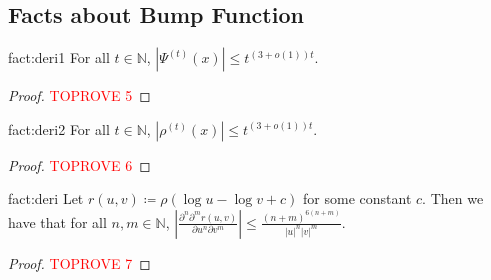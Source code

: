 \documentclass[12pt]{article}
\newcommand{\N}{\mathbb{N}}  \newcommand{\R}{\mathbb{R}} \newcommand{\C}{\mathbb{C}} \newcommand{\U}{\mathbb{U}} \renewcommand{\d}{\mathrm{d}} \DeclareMathOperator*{\E}{\mathbb{E}}  \newcommand{\so}{\mathrm{SO}} \newcommand{\s}{\mathrm{S}} \newcommand{\su}{\mathrm{SU}} \renewcommand{\i}{\mathrm{i}} \newcommand{\A}{\mathcal{A}}  \newcommand{\B}{\mathcal{B}} \newcommand{\CC}{\mathcal{C}} \newcommand{\D}{\mathcal{D}} \newcommand{\F}{\mathcal{F}} \renewcommand{\H}{\mathcal{H}} \newcommand{\K}{\mathcal{K}} \newcommand{\NN}{\mathcal{N}} \newcommand{\V}{\mathcal{V}} \newcommand{\X}{\mathcal{X}} \newcommand{\Y}{\mathcal{Y}} \renewcommand{\S}{\mathcal{S}} \newcommand{\SR}{\mathcal{S}_{\R}} \newcommand{\SC}{\mathcal{S}_{\C}} \newcommand{\EE}{\mathcal{E}}  \newcommand{\PP}{\mathcal{P}} \newcommand{\KK}{\widetilde{K}} \newcommand{\LL}{\widetilde{L}} \newcommand{\W}{\widehat{W}} \newcommand{\f}{\hat{f}} \newcommand{\g}{\hat{g}} \newcommand{\h}{\hat{h}} \newcommand{\bit}[1]{\{0,1\}^{#1}} \newcommand{\wrt}{w.r.t.~} \newcommand{\us}{\overset{\$}{\leftarrow}} \newcommand{\set}[1]{\left\{#1\right\}} \newcommand{\lhs}{\mathrm{LHS}} \newcommand{\expec}[1]{\E\!\Br{#1}} \newcommand{\expect}[2]{\E_{\substack{#1}}\!\Br{#2}} \newcommand{\prob}[2]{\underset{#1}{\mathrm{Pr}}\!\Br{#2}} \newcommand{\cf}{\widetilde{f}} \newcommand{\cg}{\widetilde{g}} \newcommand{\ch}{\widetilde{h}} \newcommand{\ck}{\widetilde{K}} \newcommand{\rep}[2]{\br{#1}_{#2}} \newcommand{\AND}[1]{\mathrm{AND}\!\br{#1}}
\newcommand{\br}[1]{\left(#1\right)} \newcommand{\Br}[1]{\left[#1\right]} \newcommand{\st}[1]{\left\{#1\right\}} \newcommand{\tr}[1]{\mathrm{Tr}\!\Br{#1}} \newcommand{\abs}[1]{\left|#1 \right|} \newcommand{\norm}[1]{\left\lVert #1 \right\rVert} \newcommand{\agl}[2]{\theta^{\br{#1}}_{#2}} \newcommand{\aglp}[2]{{\theta'}^{\br{#1}}_{#2}} \newcommand{\lint}[1]{\left\lfloor#1\right\rfloor} \newcommand{\poly}[1]{\mathrm{poly}\!\br{#1}} \newcommand{\negl}[1]{\mathrm{negl}\!\br{#1}} \newcommand{\de}[1]{\mathrm{d}#1} \newcommand{\val}[1]{\mathrm{val}\!\br{#1}} \newcommand{\vall}[1]{\mathrm{val}\br{#1}} \newcommand{\nd}[1]{\mathcal{N}\!\br{#1}} \newcommand{\ketbratwo}[2]{\ket{#1} \hspace{-0.4em}\bra{#2}} \newcommand{\ketbra}[1]{\ketbratwo{#1}{#1}} \newcommand{\id}{\ensuremath{\mathds{1}}} \newcommand{\ogroup}[1]{\mathrm{O}\!\br{#1}} \newcommand{\ugroup}[1]{\mathrm{U}\!\br{#1}} \newcommand{\td}{\mathrm{TD}} \newcommand{\tv}[1]{\norm{#1}_{\mathrm{TV}}} \newcommand {\defeq} {\ensuremath{ \stackrel{\mathrm{def}}{=} }} \newcommand{\vdim}{\ensuremath{N}} \newcommand{\dimin}{\ensuremath{n}} \newcommand{\dimout}{\ensuremath{m}} \newcommand{\ncopy}{\ell} \newcommand{\hspacein}{\H_\mathrm{in}} \newcommand{\hspaceout}{\H_\mathrm{out}} \newcommand{\Sin}{\S(\hspacein)} \newcommand{\Sout}{\S(\hspaceout)} \newcommand{\haar}{\ensuremath{\mu}} \newcommand{\tensorhaar}{\ensuremath{\eta}} \newcommand{\tensorsrss}{\ensuremath{\nu}} \newcommand{\qadvice}{\ensuremath{\rho}} \newcommand{\tp}{\otimes} \newcommand{\wone}[2]{W_1\!\br{#1,#2}}
\begin{document}
\newpage
\begin{appendices}
\addappheadtotoc
{}

\section{Facts about Bump Function}
\label{sec:fact_bump}

\begin{repfact}{fact:deri1}
		For all $t\in \N$, $\abs{\Psi^{(t)}(x) } \leq t^{(3+o(1))t}$.
\end{repfact}

\begin{proof}\textcolor{red}{TOPROVE 5}\end{proof}


\begin{repfact}{fact:deri2}
	For all $t\in \N$, $\abs{\rho^{(t)}(x)} \leq t^{(3+o(1))t}$.
\end{repfact}

\begin{proof}\textcolor{red}{TOPROVE 6}\end{proof}

\begin{repfact}{fact:deri}
	Let $r(u,v) \coloneq \rho( \log u-\log v + c )$ for some constant $c$. Then we have that for all $n,m\in \N$,
	$ \abs{ \frac{ \partial^n \partial^m r(u,v) }{ \partial u^n \partial v^m } } \leq \frac{(n+m)^{6(n+m)}}{\abs{u}^n \abs{v}^m} $.
\end{repfact}

\begin{proof}\textcolor{red}{TOPROVE 7}\end{proof}


%
 
\end{appendices}
\end{document}
